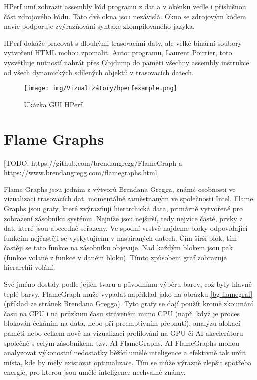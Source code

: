 HPerf umí zobrazit assembly kód programu z dat a v okénku vedle i příslušnou část zdrojového kódu. Tato dvě okna jsou nezávislá. Okno se zdrojovým kódem navíc podporuje zvýrazňování syntaxe zkompilovaného jazyka.

HPerf dokáže pracovat s dlouhými trasovacími daty, ale velké binární soubory vytvoření HTML mohou zpomalit. Autor programu, Laurent Poirrier, toto vysvětluje nutností nahrát přes Objdump do paměti všechny assembly instrukce od všech dynamických sdílených objektů v trasovacích datech.

\begin{figure}[p]\centering
    \texttt{[image: img/Vizualizátory/hperfexample.png]}
    \caption{Ukázka GUI HPerf}
    \label{hperfexample}
\end{figure}

\section{Flame Graphs}
\label{flamegrafy}

[TODO: https://github.com/brendangregg/FlameGraph a https://www.brendangregg.com/flamegraphs.html]

Flame Graphs jsou jedním z výtvorů Brendana Gregga, známé osobnosti ve vizualizaci trasovacích dat, momentálně zaměstnaným ve společnosti Intel. Flame Graphs jsou grafy, které zvýrazňují hierarchická data, primárně vytvořené pro zobrazení zásobníku systému. Nejníže jsou nejširší, tedy nejvíce časté, prvky z dat, které jsou abecedně seřazeny. Ve spodní vrstvě najdeme bloky odpovídající funkcím nejčastěji se vyskytujícím v nasbíraných datech. Čím širší blok, tím častěji se tato funkce na zásobníku objevuje. Nad každým blokem jsou pak  (funkce volané z funkce v daném bloku). Tímto způsobem graf zobrazuje hierarchii volání.

Své jméno dostaly podle jejich tvaru a původnímu výběru barev, což byly hlavně teplé barvy. FlameGraph může vypadat například jako na obrázku \ref{bg-flamegraf} (příklad ze stránek Brendana Gregga). Tyto grafy se dají použít kromě zkoumání času na CPU i na průzkum času stráveném mimo CPU (např. když je proces blokován čekáním na data, nebo při preemptivním přepnutí), analýzu alokací paměti nebo celkem nově na vizualizaci profilování na GPU či AI akcelerátoru společně s celým zásobníkem, tzv. AI FlameGraphs. AI FlameGraphs mohou analyzovat výkonostní nedostatky běžící umělé inteligence a efektivně tak určit místa, kde by měly existovat optimalizace. Tím se může výrazně zlepšit spotřeba energie, pro kterou jsou umělé inteligence nechvalně známy.

